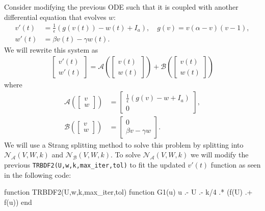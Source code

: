 \documentclass[12pt]{report}
\begin{document}
\begin{solution}

    \noindent
    Consider modifying the previous ODE such that it is coupled with another differential equation that evolves $w$:
    \begin{align*} 
        v'(t) &= \frac 1 \epsilon \left( g(v(t)) - w(t) + I_a \right), \quad g(v) = v (\alpha - v) (v-1),\\
        w'(t) &= \beta v(t) - \gamma w(t).
    \end{align*}
    We will rewrite this system as
    \begin{align*}
        \begin{bmatrix} v'(t) \\ w'(t) \end{bmatrix} = \mathcal A\left(\begin{bmatrix} v(t) \\ w(t) \end{bmatrix} \right) + \mathcal B\left(\begin{bmatrix} v(t) \\ w(t) \end{bmatrix} \right)
        \end{align*}
        where
        \begin{align*}
        \mathcal A \left(\begin{bmatrix} v \\ w \end{bmatrix} \right) &= \begin{bmatrix} \frac 1 \epsilon \left( g(v) - w+ I_a \right) \\ 0\end{bmatrix}, \\
        \mathcal B \left(\begin{bmatrix} v \\ w \end{bmatrix} \right) &= \begin{bmatrix} 0 \\ \beta v - \gamma w\end{bmatrix}.
    \end{align*}
    We will use a Strang splitting method to solve this problem by splitting into $\mathcal N_{\mathcal A}(V,W,k)$ and $\mathcal N_{\mathcal B}(V,W,k)$. To solve $\mathcal N_{\mathcal A}(V,W,k)$ we will modify the previous \verb+TRBDF2(U,w,k,max_iter,tol)+ to fit the updated $v'(t)$ function as seen in the following code:
    \begin{jllisting}
function TRBDF2(U,w,k,max_iter,tol)
    function G1(u)
        u .- U .- k/4 .* (f(U) .+ f(u))
    end
    

\end{jllisting}
\end{solution}
\end{document}

